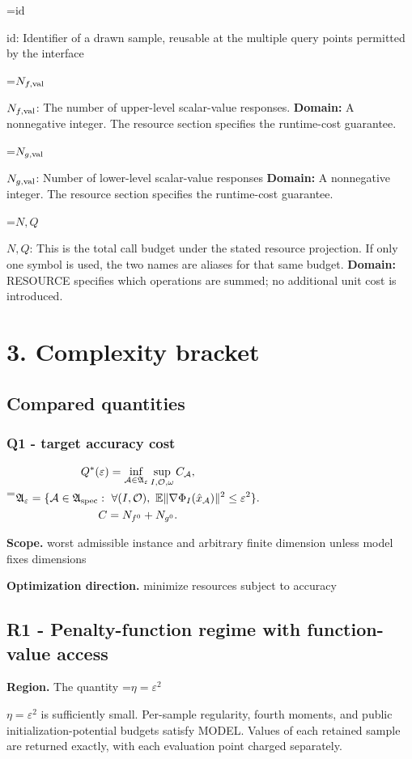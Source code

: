 \documentclass[10pt,a4paper]{article}
\newcommand{\AtlasMath}[1]{\par\begingroup\centering\setbox0=\hbox{$\displaystyle #1$}\ifdim\wd0>1.4\linewidth\typeout{ATLAS WIDE FORMULA: \the\wd0}\fi\ifdim\wd0>\linewidth\resizebox{\linewidth}{!}{\box0}\else\box0\fi\par\endgroup}
\newcommand{\AtlasInlineMath}[1]{\begingroup\setbox0=\hbox{$#1$}\ifdim\wd0>.4\linewidth\endgroup\AtlasMath{#1}\else\endgroup$#1$\fi}
\begin{document}
\AtlasInlineMath{\mathrm{id}}: Identifier of a drawn sample, reusable at the multiple query points permitted by the interface

\AtlasInlineMath{N_{f,\rm val}}: The number of upper-level scalar-value responses. \textbf{Domain:} A nonnegative integer. The resource section specifies the runtime-cost guarantee.

\AtlasInlineMath{N_{g,\rm val}}: Number of lower-level scalar-value responses \textbf{Domain:} A nonnegative integer. The resource section specifies the runtime-cost guarantee.

\AtlasInlineMath{N,Q}: This is the total call budget under the stated resource projection. If only one symbol is used, the two names are aliases for that same budget. \textbf{Domain:} RESOURCE specifies which operations are summed; no additional unit cost is introduced.

\section{3. Complexity bracket}
\subsection{Compared quantities}
\subsubsection{Q1 - target accuracy cost}
\AtlasMath{\begin{gathered}Q^*(\varepsilon)=\inf_{\mathcal A\in\mathfrak A_\varepsilon}\sup_{I,\mathcal O,\omega}C_{\mathcal A},\\\mathfrak A_\varepsilon=\{\mathcal A\in\mathfrak A_{\rm spec}:\ \forall(I,\mathcal O),\ \mathbb E\|\nabla\Phi_I(\hat x_{\mathcal A})\|^2\le\varepsilon^2\}.\\C=N_{f^0}+N_{g^0}.\end{gathered}}
\textbf{Scope.} worst admissible instance and arbitrary finite dimension unless model fixes dimensions

\textbf{Optimization direction.} minimize resources subject to accuracy

\subsection{R1 - Penalty-function regime with function-value access}
\textbf{Region.} The quantity \AtlasInlineMath{\eta=\varepsilon^2} is sufficiently small. Per-sample regularity, fourth moments, and public initialization-potential budgets satisfy MODEL. Values of each retained sample are returned exactly, with each evaluation point charged separately.
\end{document}
